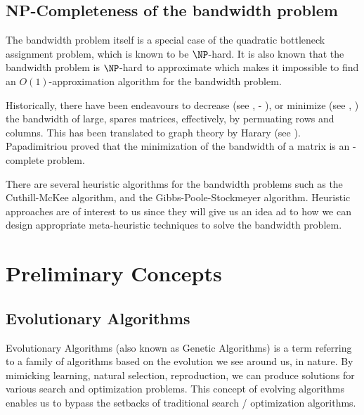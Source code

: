 \documentclass[conference,compsoc]{IEEEtran}
\begin{document}
\subsection{NP-Completeness of the bandwidth problem}

The bandwidth problem itself is a special case of the quadratic bottleneck assignment problem, which is known to be 
$\NP$-hard. It is also known that the bandwidth problem is $\NP$-hard to approximate which makes it impossible to find 
an $O(1)$-approximation algorithm for the bandwidth problem. 

Historically, there have been endeavours to decrease (see \cite{10.1145/800195.805928}, - \cite{sparse}), or minimize 
(see \cite{chen}, \cite{chen2}) 
the bandwidth of large, spares matrices, effectively, by permuating rows and columns. 
This has been translated to graph theory by Harary (see \cite{1973141}). 
Papadimitriou proved that the minimization of the bandwidth of a matrix is an 
\NP-complete problem. \cite{papadimitriou_1976}

There are several heuristic algorithms for the bandwidth problems such as the Cuthill-McKee algorithm, and the 
Gibbs-Poole-Stockmeyer algorithm.  Heuristic approaches are of interest to us since they will give us an 
idea ad to how we can design appropriate meta-heuristic techniques to solve the bandwidth problem. 

\section{Preliminary Concepts}
\subsection{Evolutionary Algorithms}
Evolutionary Algorithms (also known as Genetic Algorithms) is a term referring to a 
family of algorithms based on the evolution we see around us, in nature. By mimicking learning, 
natural selection, reproduction, we can produce solutions for various search and optimization problems. 
This concept of evolving algorithms enables us to bypass the setbacks of traditional search / optimization algorithms.
\end{document}
